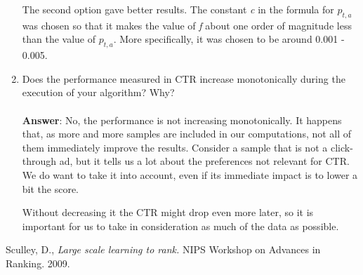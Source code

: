 \documentclass[11pt]{article}
\begin{document}
\begin{enumerate}
The second option gave better results. The constant \emph{c} in the formula for $p_{t,a}$
was chosen so that it makes the value of \emph{f} about one order of magnitude less than
the value of $p_{t,a}$. More specifically, it was chosen to be around 0.001 - 0.005.

\item Does the performance measured in CTR increase monotonically during the
execution of your algorithm? Why? \\ \\
\textbf{Answer}: No, the performance is not increasing monotonically.
It happens that, as more and more samples are included in our
computations, not all of them immediately improve the results.
Consider a sample that is not a click-through ad, but it tells us a lot
about the preferences not relevant for CTR. We do want to take it into
account, even if its immediate impact is to lower a bit the score.

Without decreasing it the CTR might drop even more later, so it is
important for us to take in consideration as much of the data as
possible.

\end{enumerate}


\begin{thebibliography}{100}

 Sculley, D., \emph{Large scale learning to rank.} 
NIPS Workshop on Advances in Ranking. 2009.

\end{thebibliography}
\end{document}
